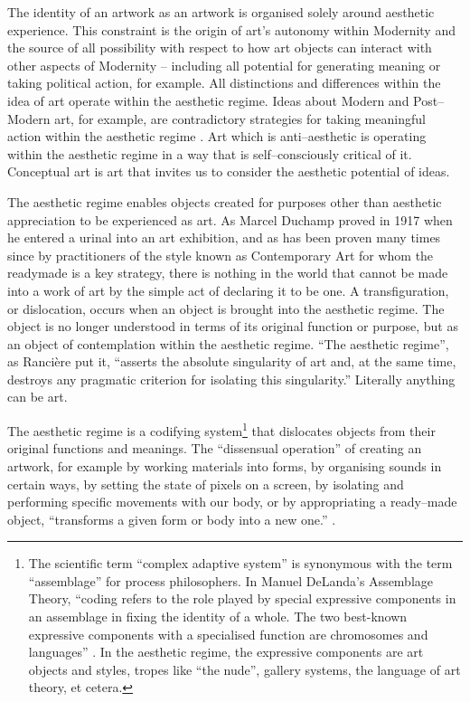 \documentclass[letter:wpaper]{article}
\begin{document}
    The identity of an artwork as an artwork is organised solely around aesthetic experience. This constraint is the origin of art's autonomy within Modernity and the source of all possibility with respect to how art objects can interact with other aspects of Modernity – including all potential for generating meaning or taking political action, for example. All distinctions and differences within the idea of art operate within the aesthetic regime. Ideas about Modern and Post–Modern art, for example, are contradictory strategies for taking meaningful action within the aesthetic regime \citep[p213]{ZepkeSblmArt2017}. Art which is anti–aesthetic is operating within the aesthetic regime in a way that is self–consciously critical of it. Conceptual art is art that invites us to consider the aesthetic potential of ideas.

    The aesthetic regime enables objects created for purposes other than aesthetic appreciation to be experienced as art. As Marcel Duchamp proved in 1917 when he entered a urinal into an art exhibition, and as has been proven many times since by practitioners of the style known as Contemporary Art for whom the readymade is a key strategy, there is nothing in the world that cannot be made into a work of art by the simple act of declaring it to be one. A transfiguration, or dislocation, occurs when an object is brought into the aesthetic regime. The object is no longer understood in terms of its original function or purpose, but as an object of contemplation within the aesthetic regime. “The aesthetic regime”, as Rancière put it, “asserts the absolute singularity of art and, at the same time, destroys any pragmatic criterion for isolating this singularity.” Literally anything can be art.
    
    The aesthetic regime is a codifying system\footnote{
        The scientific term “complex adaptive system” is synonymous with the term “assemblage” for process philosophers. In Manuel DeLanda's Assemblage Theory, “coding refers to the role played by special expressive components in an assemblage in fixing the identity of a whole. The two best-known expressive components with a specialised function are chromosomes and languages” \citep[p.22]{DeLandaAssmblgThry2016}. In the aesthetic regime, the expressive components are art objects and styles, tropes like “the nude”, gallery systems, the language of art theory, et cetera.
    } that dislocates objects from their original functions and meanings. The “dissensual operation” of creating an artwork, for example by working materials into forms, by organising sounds in certain ways, by setting the state of pixels on a screen, by isolating and performing specific movements with our body, or by appropriating a ready–made object, “transforms a given form or body into a new one.” \citep[p.54]{RancierThEmncptdSpcttr2009}.
\end{document}
